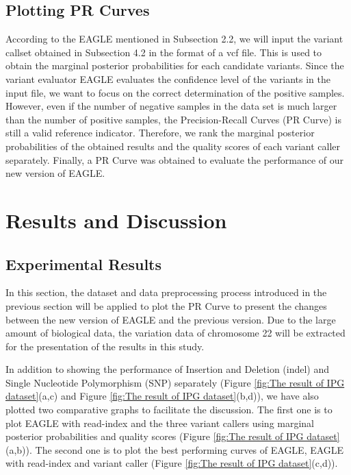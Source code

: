 \documentclass[PhD]{PHlab-thesis}
\begin{document}
\section{Plotting PR Curves}
According to the EAGLE mentioned in Subsection 2.2, we will input the variant callset obtained in Subsection 4.2 in the format of a vcf file. This is used to obtain the marginal posterior probabilities for each candidate variants.
Since the variant evaluator EAGLE evaluates the confidence level of the variants in the input file, we want to focus on the correct determination of the positive samples.
However, even if the number of negative samples in the data set is much larger than the number of positive samples, the Precision-Recall Curves (PR Curve) is still a valid reference indicator.
Therefore, we rank the marginal posterior probabilities of the obtained results and the quality scores of each variant caller separately. Finally, a PR Curve was obtained to evaluate the performance of our new version of EAGLE.

\chapter{Results and Discussion}
\section{Experimental Results}
In this section, the dataset and data preprocessing process introduced in the previous section will be applied to plot the PR Curve to present the changes between the new version of EAGLE and the previous version. Due to the large amount of biological data, the variation data of chromosome 22 will be extracted for the presentation of the results in this study.

In addition to showing the performance of Insertion and Deletion (indel) and Single Nucleotide Polymorphism (SNP) separately (Figure \ref{fig:The result of IPG dataset}(a,c) and Figure \ref{fig:The result of IPG dataset}(b,d)), we have also plotted two comparative graphs to facilitate the discussion.
The first one is to plot EAGLE with read-index and the three variant callers using marginal posterior probabilities and quality scores (Figure \ref{fig:The result of IPG dataset}(a,b)).
The second one is to plot the best performing curves of EAGLE, EAGLE with read-index and variant caller (Figure \ref{fig:The result of IPG dataset}(c,d)).
\end{document}
